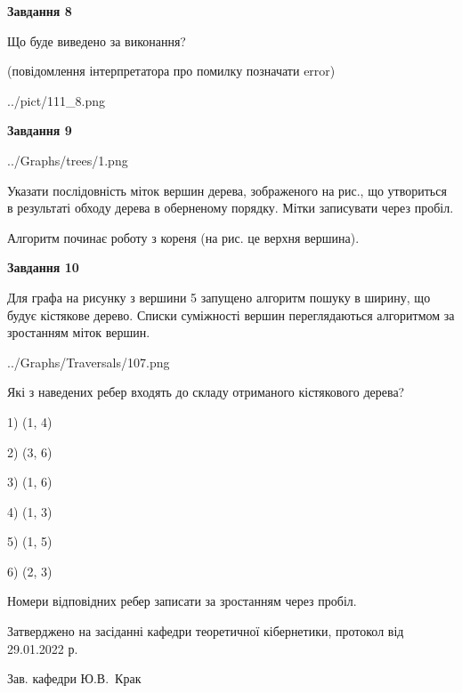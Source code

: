 \documentclass[12pt, ukrainian]{article}
\begin{document}
{\begin {large}
{\begin {center}\textbf{Завдання 8}\end {center}}\par
Що буде виведено за виконання?\par
 (повідомлення інтерпретатора про помилку позначати error)\par
\begin{center}
	{../pict/111_8.png}
\end{center}
\newpage

{\begin {center}\textbf{Завдання 9}\end {center}}\par

\begin{center}
	{../Graphs/trees/1.png}
\end{center}
Указати послідовність міток вершин дерева, зображеного на рис., що утвориться в результаті обходу дерева в оберненому порядку. Мітки записувати через пробіл.\par Алгоритм починає роботу з кореня (на рис. це верхня вершина).\par
\newpage

{\begin {center}\textbf{Завдання 10}\end {center}}\par
Для графа на рисунку з вершини 5 запущено алгоритм пошуку в ширину, що будує кістякове дерево. Списки суміжності вершин переглядаються алгоритмом за зростанням міток вершин.\par
\begin{center}
	{../Graphs/Traversals/107.png}
\end{center}
\par Які з наведених ребер входять до складу отриманого кістякового дерева?\par
1) (1, 4)\par
2) (3, 6)\par
3) (1, 6)\par
4) (1, 3)\par
5) (1, 5)\par
6) (2, 3)\par
{\vskip 15pt} Номери відповідних ребер записати за зростанням через пробіл.\par
\newpage


\end {large}
}
{\smallskip \begin {small} Затверджено на засіданні кафедри теоретичної кібернетики, протокол  від   29.01.2022 р.\par\smallskip\smallskip
{\parbox {6.5 cm}{Зав. кафедри \dotfill Ю.В.~Крак}} \end{small}}
\end{document}
